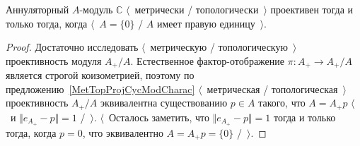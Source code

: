 \begin{proposition}\label{MetTopProjModCCharac} Аннуляторный $A$-модуль
$\mathbb{C}$ $\langle$~метрически / топологически~$\rangle$ проективен тогда и
только тогда, когда $\langle$~$A= \{0 \}$ / $A$ имеет правую единицу~$\rangle$.
\end{proposition}
\begin{proof} 
Достаточно исследовать $\langle$~метрическую / топологическую~$\rangle$
проективность модуля $A_+/A$. Естественное фактор-отображение $\pi:A_+\to A_+/A$
является строгой коизометрией, поэтому по
предложению~\ref{MetTopProjCycModCharac} $\langle$~метрическая /
топологическая~$\rangle$ проективность $A_+/A$ эквивалентна существованию $p\in
A$ такого, что $A=A_+p$ $\langle$~и $\Vert e_{A_+}-p\Vert=1$ /~$\rangle$.
$\langle$~Осталось заметить, что $\Vert e_{A_+}-p\Vert=1$ тогда и только тогда,
когда $p=0$, что эквивалентно $A=A_+p= \{0 \}$ /~$\rangle$.
\end{proof}


